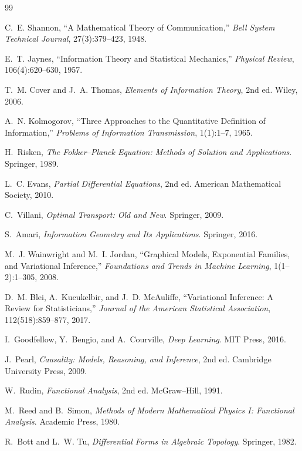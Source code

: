 \documentclass[12pt]{article}
\begin{document}
\begin{thebibliography}{99}

C.~E. Shannon,
``A Mathematical Theory of Communication,''
\emph{Bell System Technical Journal}, 27(3):379--423, 1948.

E.~T. Jaynes,
``Information Theory and Statistical Mechanics,''
\emph{Physical Review}, 106(4):620--630, 1957.

T.~M. Cover and J.~A. Thomas,
\emph{Elements of Information Theory}, 2nd ed.
Wiley, 2006.

A.~N. Kolmogorov,
``Three Approaches to the Quantitative Definition of Information,''
\emph{Problems of Information Transmission}, 1(1):1--7, 1965.

H.~Risken,
\emph{The Fokker--Planck Equation: Methods of Solution and Applications}.
Springer, 1989.

L.~C. Evans,
\emph{Partial Differential Equations}, 2nd ed.
American Mathematical Society, 2010.

C.~Villani,
\emph{Optimal Transport: Old and New}.
Springer, 2009.

S.~Amari,
\emph{Information Geometry and Its Applications}.
Springer, 2016.

M.~J. Wainwright and M.~I. Jordan,
``Graphical Models, Exponential Families, and Variational Inference,''
\emph{Foundations and Trends in Machine Learning}, 1(1--2):1--305, 2008.

D.~M. Blei, A.~Kucukelbir, and J.~D. McAuliffe,
``Variational Inference: A Review for Statisticians,''
\emph{Journal of the American Statistical Association}, 112(518):859--877, 2017.

I.~Goodfellow, Y.~Bengio, and A.~Courville,
\emph{Deep Learning}.
MIT Press, 2016.

J.~Pearl,
\emph{Causality: Models, Reasoning, and Inference}, 2nd ed.
Cambridge University Press, 2009.

W.~Rudin,
\emph{Functional Analysis}, 2nd ed.
McGraw--Hill, 1991.

M.~Reed and B.~Simon,
\emph{Methods of Modern Mathematical Physics I: Functional Analysis}.
Academic Press, 1980.

R.~Bott and L.~W. Tu,
\emph{Differential Forms in Algebraic Topology}.
Springer, 1982.


\end{thebibliography}
\end{document}
